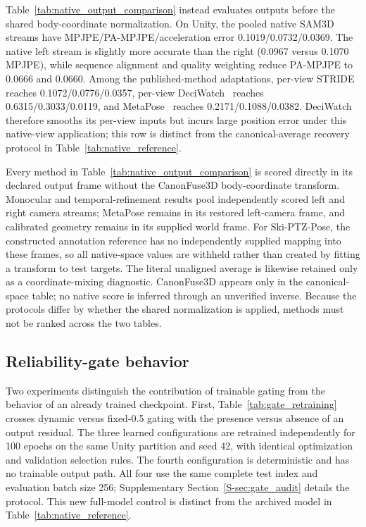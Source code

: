 \documentclass[preprint,12pt]{elsarticle}
\begin{document}



Table~\ref{tab:native_output_comparison} instead evaluates outputs before the shared body-coordinate normalization. On Unity, the pooled native SAM3D streams have MPJPE/PA-MPJPE/acceleration error 0.1019/0.0732/0.0369. The native left stream is slightly more accurate than the right (0.0967 versus 0.1070 MPJPE), while sequence alignment and quality weighting reduce PA-MPJPE to 0.0666 and 0.0660. Among the published-method adaptations, per-view STRIDE~\cite{lal2025stride} reaches 0.1072/0.0776/0.0357, per-view DeciWatch~\cite{zeng2022deciwatch} reaches 0.6315/0.3033/0.0119, and MetaPose~\cite{usman2022metapose} reaches 0.2171/0.1088/0.0382. DeciWatch therefore smooths its per-view inputs but incurs large position error under this native-view application; this row is distinct from the canonical-average recovery protocol in Table~\ref{tab:native_reference}.

Every method in Table~\ref{tab:native_output_comparison} is scored directly in its declared output frame without the CanonFuse3D body-coordinate transform. Monocular and temporal-refinement results pool independently scored left and right camera streams; MetaPose remains in its restored left-camera frame, and calibrated geometry remains in its supplied world frame. For Ski-PTZ-Pose, the constructed annotation reference has no independently supplied mapping into these frames, so all native-space values are withheld rather than created by fitting a transform to test targets. The literal unaligned average is likewise retained only as a coordinate-mixing diagnostic. CanonFuse3D appears only in the canonical-space table; no native score is inferred through an unverified inverse. Because the protocols differ by whether the shared normalization is applied, methods must not be ranked across the two tables.

\FloatBarrier
\subsection{Reliability-gate behavior}

Two experiments distinguish the contribution of trainable gating from the behavior of an already trained checkpoint. First, Table~\ref{tab:gate_retraining} crosses dynamic versus fixed-0.5 gating with the presence versus absence of an output residual. The three learned configurations are retrained independently for 100 epochs on the same Unity partition and seed 42, with identical optimization and validation selection rules. The fourth configuration is deterministic and has no trainable output path. All four use the same complete test index and evaluation batch size 256; Supplementary Section~\ref{S-sec:gate_audit} details the protocol. This new full-model control is distinct from the archived model in Table~\ref{tab:native_reference}.
\end{document}

